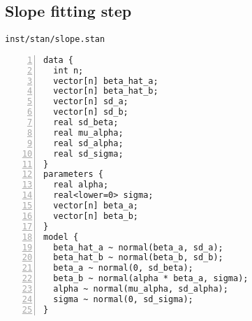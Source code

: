\documentclass[11pt]{article}
\begin{document}
\newpage

\subsection{Slope fitting step}

\texttt{inst/stan/slope.stan}

\begin{Verbatim}[frame=single,numbers=left]
data {
  int n; 
  vector[n] beta_hat_a;
  vector[n] beta_hat_b;
  vector[n] sd_a;
  vector[n] sd_b;
  real sd_beta;
  real mu_alpha;
  real sd_alpha;
  real sd_sigma;
}
parameters {
  real alpha;
  real<lower=0> sigma;
  vector[n] beta_a;
  vector[n] beta_b;
}
model {
  beta_hat_a ~ normal(beta_a, sd_a);
  beta_hat_b ~ normal(beta_b, sd_b);
  beta_a ~ normal(0, sd_beta);
  beta_b ~ normal(alpha * beta_a, sigma);
  alpha ~ normal(mu_alpha, sd_alpha);
  sigma ~ normal(0, sd_sigma);
}
\end{Verbatim}

\newpage


\end{document}
